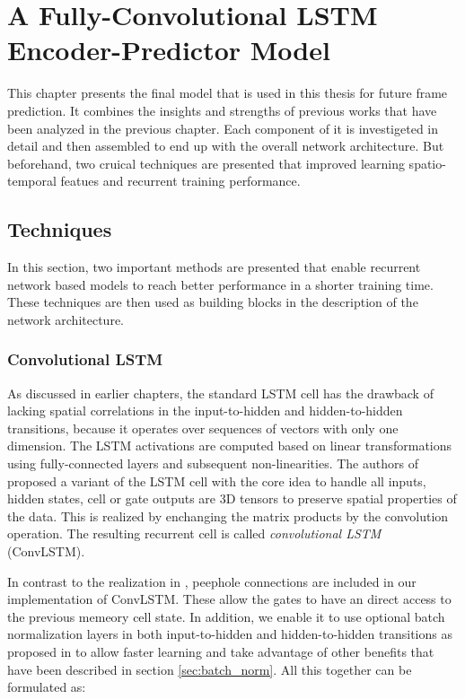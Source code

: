 
\chapter{A Fully-Convolutional LSTM Encoder-Predictor Model} \label{chapter:implementation}

This chapter presents the final model that is used in this thesis for future frame prediction. It combines the insights and strengths of previous works that have been analyzed in the previous chapter. Each component of it is investigeted in detail and then assembled to end up with the overall network architecture. But beforehand, two cruical techniques are presented that improved learning spatio-temporal featues and recurrent training performance.

\section{Techniques}

In this section, two important methods are presented that enable recurrent network based models to reach better performance in a shorter training time. These techniques are then used as building blocks in the description of the network architecture.

\subsection{Convolutional LSTM} \label{sec:conv_lstm}

As discussed in earlier chapters, the standard LSTM cell has the drawback of lacking spatial correlations in the input-to-hidden and hidden-to-hidden transitions, because it operates over sequences of vectors with only one dimension. The LSTM activations are computed based on linear transformations using fully-connected layers and subsequent non-linearities. The authors of \parencite{conv_lstm_nowcasting} proposed a variant of the LSTM cell with the core idea to handle all inputs, hidden states, cell or gate outputs are 3D tensors to preserve spatial properties of the data. This is realized by enchanging the matrix products by the convolution operation. The resulting recurrent cell is called \textit{convolutional LSTM} (ConvLSTM).

In contrast to the realization in \parencite{spat_temp_video_autoenc}, peephole connections are included in our implementation of ConvLSTM. These allow the gates to have an direct access to the previous memeory cell state. In addition, we enable it to use optional batch normalization layers in both input-to-hidden and hidden-to-hidden transitions as proposed in \parencite{rnn-batchnorm} to allow faster learning and take advantage of other benefits that have been described in section \ref{sec:batch_norm}. All this together can be formulated as:

